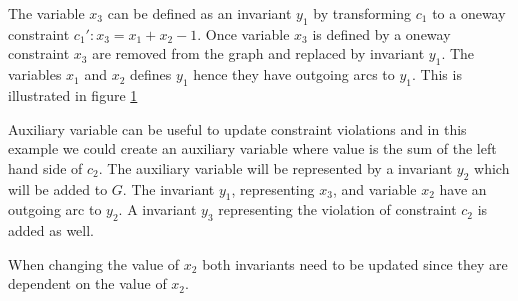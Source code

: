 The variable $x_3$ can be defined as an invariant $y_1$ by transforming $c_1$ to a oneway constraint $c_1': x_3 = 
x_1+x_2-1$. Once variable $x_3$ is defined by a oneway constraint $x_3$ are removed from the graph and replaced by 
invariant $y_1$. The variables $x_1$ and $x_2$ defines $y_1$ hence they have outgoing arcs to $y_1$. This is 
illustrated in figure \ref{fig_smallG} 
\begin{figure}[t]
\begin{center}
    \label{fig_smallG}
\end{center}
\end{figure} \noindent
Auxiliary variable can be useful to update constraint violations and in this example we could create an auxiliary 
variable where value is the sum of the left hand side of $c_2$. The auxiliary variable will be represented 
by a  invariant $y_2$ which will be added to $G$. The invariant $y_1$, representing $x_3$, and variable 
$x_2$ have an outgoing arc to $y_2$. A  invariant $y_3$ representing the violation of constraint 
$c_2$ is added as well.
\begin{figure}[b]
\begin{center}
    \label{fig_smallG2}
\end{center}
\end{figure}
When changing the value of $x_2$ both invariants need to be updated since they are dependent on the value of $x_2$. 
